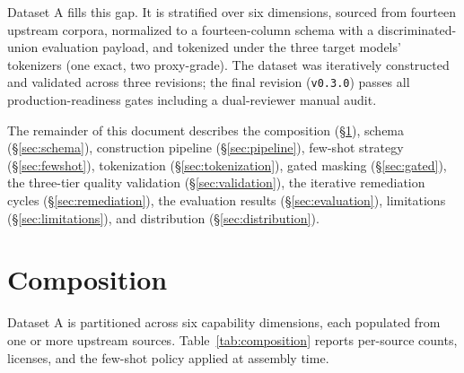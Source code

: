 \documentclass[11pt,a4paper]{article}
\begin{document}
Dataset A fills this gap. It is stratified over six dimensions, sourced from fourteen upstream corpora, normalized to a fourteen-column schema with a discriminated-union evaluation payload, and tokenized under the three target models' tokenizers (one exact, two proxy-grade). The dataset was iteratively constructed and validated across three revisions; the final revision (\texttt{v0.3.0}) passes all production-readiness gates including a dual-reviewer manual audit.

The remainder of this document describes the composition (§\ref{sec:composition}), schema (§\ref{sec:schema}), construction pipeline (§\ref{sec:pipeline}), few-shot strategy (§\ref{sec:fewshot}), tokenization (§\ref{sec:tokenization}), gated masking (§\ref{sec:gated}), the three-tier quality validation (§\ref{sec:validation}), the iterative remediation cycles (§\ref{sec:remediation}), the evaluation results (§\ref{sec:evaluation}), limitations (§\ref{sec:limitations}), and distribution (§\ref{sec:distribution}).

\section{Composition}\label{sec:composition}

Dataset A is partitioned across six capability dimensions, each populated from one or more upstream sources. Table~\ref{tab:composition} reports per-source counts, licenses, and the few-shot policy applied at assembly time.
\end{document}
